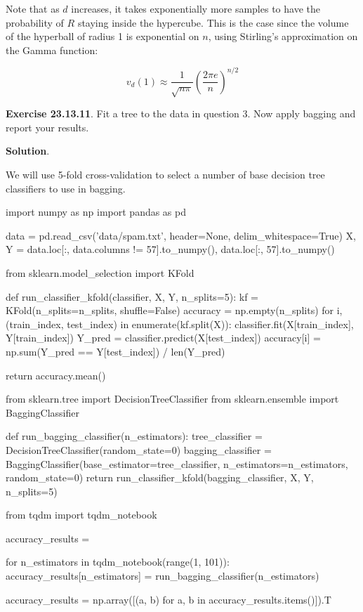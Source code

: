 Note that as \(d\) increases, it takes exponentially more samples to
have the probability of \(R\) staying inside the hypercube. This is the
case since the volume of the hyperball of radius 1 is exponential on
\(n\), using Stirling's approximation on the Gamma function:

\[ v_d(1) \approx \frac{1}{\sqrt{n \pi}} \left( \frac{2 \pi e}{n}\right)^{n/2} \]

\textbf{Exercise 23.13.11}. Fit a tree to the data in question 3. Now
apply bagging and report your results.

\textbf{Solution}.

We will use 5-fold cross-validation to select a number of base decision
tree classifiers to use in bagging.

\begin{python}
import numpy as np
import pandas as pd

data = pd.read_csv('data/spam.txt', header=None, delim_whitespace=True)
X, Y = data.loc[:, data.columns != 57].to_{n}umpy(), data.loc[:, 57].to_{n}umpy()
\end{python}

\begin{python}
from sklearn.model_selection import KFold

def run_classifier_{k}fold(classifier, X, Y, n_splits=5):
    kf = KFold(n_splits=n_splits, shuffle=False)
    accuracy = np.empty(n_splits)
    for i, (train_{i}ndex, test_{i}ndex) in enumerate(kf.split(X)):
        classifier.fit(X[train_{i}ndex], Y[train_{i}ndex])
        Y_pred = classifier.predict(X[test_{i}ndex])
        accuracy[i] = np.sum(Y_pred == Y[test_{i}ndex]) / len(Y_pred)
    
    return accuracy.mean()
\end{python}

\begin{python}
from sklearn.tree import DecisionTreeClassifier
from sklearn.ensemble import BaggingClassifier

def run_bagging_classifier(n_estimators):
    tree_classifier = DecisionTreeClassifier(random_state=0)
    bagging_classifier = BaggingClassifier(base_estimator=tree_classifier, n_estimators=n_estimators, random_state=0)
    return run_classifier_{k}fold(bagging_classifier, X, Y, n_splits=5)
\end{python}

\begin{python}
from tqdm import tqdm_{n}otebook

accuracy_results = {}

for n_estimators in tqdm_{n}otebook(range(1, 101)):
    accuracy_results[n_estimators] = run_bagging_classifier(n_estimators)
    
accuracy_results = np.array([(a, b) for a, b in accuracy_results.items()]).T
\end{python}

